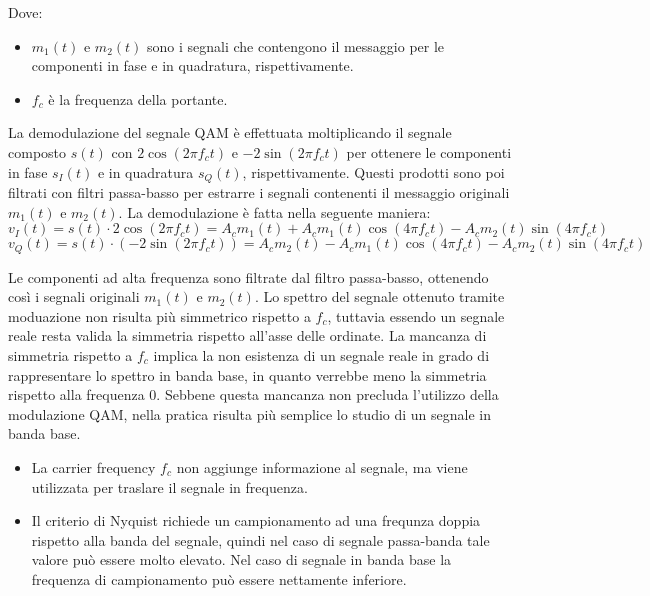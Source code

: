 Dove:
\begin{itemize}
    \item \( m_1(t) \) e \( m_2(t) \) sono i segnali che contengono il messaggio per le componenti in fase e in quadratura, rispettivamente.
    \item \( f_c \) è la frequenza della portante.
\end{itemize}


La demodulazione del segnale QAM è effettuata moltiplicando il segnale composto \( s(t) \) con \( 2\cos(2\pi f_c t) \) e \( -2\sin(2\pi f_c t) \) per ottenere le componenti in fase \( s_I(t) \) e in quadratura \( s_Q(t) \), rispettivamente.
Questi prodotti sono poi filtrati con filtri passa-basso per estrarre i segnali contenenti il messaggio originali \( m_1(t) \) e \( m_2(t) \).
La demodulazione è fatta nella seguente maniera:
\begin{equation}
    v_I(t) = s(t) \cdot 2\cos(2\pi f_c t) = A_{c} m_1(t) + A_{c} m_1(t) \cos(4\pi f_c t) - A_{c} m_2(t) \sin(4\pi f_c t)
\end{equation}
\begin{equation}
    v_Q(t) = s(t) \cdot (-2\sin(2\pi f_c t)) = A_{c} m_2(t) - A_{c} m_1(t) \cos(4\pi f_c t) - A_{c} m_2(t) \sin(4\pi f_c t)
\end{equation}

Le componenti ad alta frequenza sono filtrate dal filtro passa-basso, ottenendo così i segnali originali \( m_1(t) \) e \( m_2(t) \).
Lo spettro del segnale ottenuto tramite moduazione non risulta più simmetrico rispetto a $f_c$, tuttavia essendo un segnale reale resta valida la simmetria rispetto all'asse delle ordinate.
La mancanza di simmetria rispetto a $f_c$ implica la non esistenza di un segnale reale in grado di rappresentare lo spettro in banda base, in quanto verrebbe meno la simmetria rispetto alla frequenza 0.
Sebbene questa mancanza non precluda l'utilizzo della modulazione QAM, nella pratica risulta più semplice lo studio di un segnale in banda base.
\begin{itemize}
    \item La carrier frequency \( f_c \) non aggiunge informazione al segnale, ma viene utilizzata per traslare il segnale in frequenza.
    \item Il criterio di Nyquist richiede un campionamento ad una frequnza doppia rispetto alla banda del segnale, quindi nel caso di segnale passa-banda tale valore può essere molto elevato. Nel caso di segnale in banda base la frequenza di campionamento può essere nettamente inferiore.
\end{itemize}

